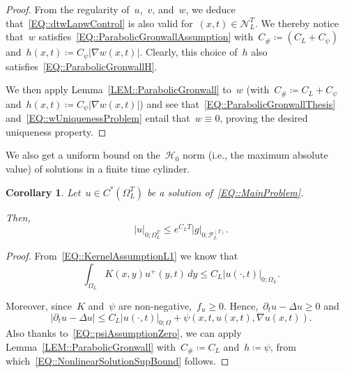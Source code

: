 \documentclass[12pt,a4paper]{amsart}
\numberwithin{equation}{section}
\newtheorem{corollary}[theorem]{Corollary}
\theoremstyle{definition}
\theoremstyle{remark}
\newcommand{\abs}[1]{\left\lvert#1\right\rvert}
\renewcommand{\leq}{\leqslant}
\renewcommand{\geq}{\geqslant}
\begin{document}
\begin{proof}
    From the regularity of~$u$,~$v$, and~$w$, we deduce that~\eqref{EQ::dtwLapwControl} is also valid for~$(x,t)\in\mathcal{N}_L^T$. We thereby notice that~$w$ satisfies~\eqref{EQ::ParabolicGronwallAssumption} with~$C_\# \coloneq \left(C_L + C_\psi\right)$ and~$h(x,t) \coloneq C_\psi \abs{\nabla w(x,t)}$. Clearly, this choice of~$h$ also satisfies~\eqref{EQ::ParabolicGronwallH}.
    
    We then apply Lemma~\ref{LEM::ParabolicGronwall} to~$w$ (with~$C_\# \coloneq C_L + C_\psi$ and~$h(x,t) \coloneq C_\psi \abs{\nabla w(x,t)}$) and see that~\eqref{EQ::ParabolicGronwallThesis} and~\eqref{EQ::wUniquenessProblem} entail that~$w\equiv 0$, proving the desired uniqueness property.
\end{proof}

We also get a uniform bound on the~$\mathcal{H}_0$ norm (i.e., the maximum absolute value) of solutions in a finite time cylinder.

\begin{corollary}\label{COR::NonlinearSolutionSupBound}
    Let~$u \in C^\ast\left(\Omega_L^T\right)$ be a solution of~\eqref{EQ::MainProblem}.
    
    Then,
    \begin{equation}\label{EQ::NonlinearSolutionSupBound}
        \abs{u}_{0; \Omega_L^T} \leq e^{C_L T}\abs{g}_{0; \mathcal{P}_L^{(T)}}.
    \end{equation}
\end{corollary}
\begin{proof}
    From~\eqref{EQ::KernelAssumptionL1} we know that
    \begin{equation}
        \int_{\Omega_L} K(x,y)u^+(y,t)\,dy \leq C_L \abs{u(\cdot,t)}_{0; \Omega_L}.
    \end{equation}

    Moreover, since~$K$ and~$\psi$ are non-negative,~$f_u \geq 0$. Hence,~$\partial_t u - \Delta u \geq 0$ and
    \begin{equation}
        \abs{\partial_t u - \Delta u} \leq C_L \abs{u(\cdot,t)}_{0; \Omega} + \psi(x,t,u(x,t),\nabla u(x,t)).
    \end{equation}
    Also thanks to~\eqref{EQ::psiAssumptionZero}, we can apply Lemma~\ref{LEM::ParabolicGronwall} with~$C_\# \coloneq C_L$ and~$h \coloneq \psi$, from which~\eqref{EQ::NonlinearSolutionSupBound} follows.
\end{proof}
\end{document}
